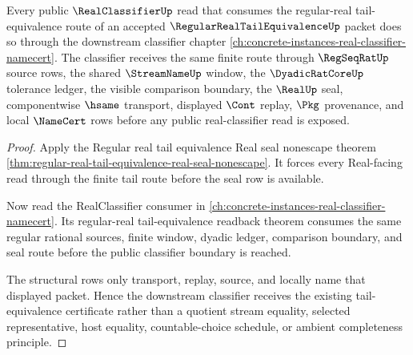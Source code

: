 \begin{theorem}
\label{thm:regular-real-tail-equivalence-classifier-forward-link}
Every public $\RealClassifierUp$ read that consumes the regular-real tail-equivalence route of an accepted $\RegularRealTailEquivalenceUp$ packet does so through the downstream classifier chapter \autoref{ch:concrete-instances-real-classifier-namecert}. The classifier receives the same finite route through $\RegSeqRatUp$ source rows, the shared $\StreamNameUp$ window, the $\DyadicRatCoreUp$ tolerance ledger, the visible comparison boundary, the $\RealUp$ seal, componentwise $\hsame$ transport, displayed $\Cont$ replay, $\Pkg$ provenance, and local $\NameCert$ rows before any public real-classifier read is exposed.
\end{theorem}
\begin{proof}
Apply the Regular real tail equivalence Real seal nonescape theorem \autoref{thm:regular-real-tail-equivalence-real-seal-nonescape}. It forces every Real-facing read through the finite tail route before the seal row is available.

Now read the RealClassifier consumer in \autoref{ch:concrete-instances-real-classifier-namecert}. Its regular-real tail-equivalence readback theorem consumes the same regular rational sources, finite window, dyadic ledger, comparison boundary, and seal route before the public classifier boundary is reached.

The structural rows only transport, replay, source, and locally name that displayed packet. Hence the downstream classifier receives the existing tail-equivalence certificate rather than a quotient stream equality, selected representative, host equality, countable-choice schedule, or ambient completeness principle.
\end{proof}
